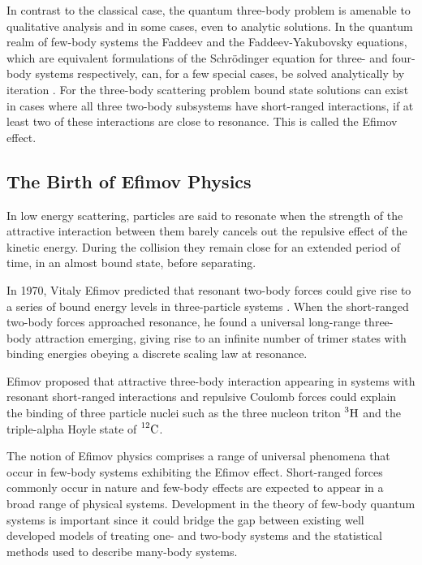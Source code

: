 \documentclass{article}
\numberwithin{equation}{section}
\numberwithin{figure}{section}
\begin{document}
In contrast to the classical case, the quantum three-body problem is amenable to qualitative analysis \cite{efimov1990qualitative} and in some cases, even to analytic solutions. In the quantum realm of few-body systems the Faddeev and the Faddeev-Yakubovsky equations, which are equivalent formulations of the Schr{\"o}dinger equation for three- and four-body systems respectively, can, for a few special cases, be solved analytically by iteration \cite{Faddeev:1960su, Zubarev:1994}. For the three-body scattering problem bound state solutions can exist in cases where all three two-body subsystems have short-ranged interactions, if at least two of these interactions are close to resonance. This is called the Efimov effect. 

\subsection{The Birth of Efimov Physics}
In low energy scattering, particles are said to resonate when the strength of the attractive interaction between them barely cancels out the repulsive effect of the kinetic energy. During the collision they remain close for an extended period of time, in an almost bound state, before separating. 

In 1970, Vitaly Efimov predicted that resonant two-body forces could give rise to a series of bound energy levels in three-particle systems \cite{Efimov:1970zz}. When the short-ranged two-body forces approached resonance, he found a universal long-range three-body attraction emerging, giving rise to an infinite number of trimer states with binding energies obeying a discrete scaling law at resonance.  
 
Efimov proposed that attractive three-body interaction appearing in systems with resonant short-ranged interactions and repulsive Coulomb forces could explain the binding of three particle nuclei such as the three nucleon triton $\prescript{3}{}{\mathrm{H}}$ and the triple-alpha Hoyle state of $\prescript{12}{}{\mathrm{C}}$.

The notion of Efimov physics comprises a range of universal phenomena that occur in few-body systems exhibiting the Efimov effect. Short-ranged forces commonly occur in nature and few-body effects are expected to appear in a broad range of physical systems. Development in the theory of few-body quantum systems is important since it could bridge the gap between existing well developed models of treating one- and two-body systems and the statistical methods used to describe many-body systems.
\end{document}
